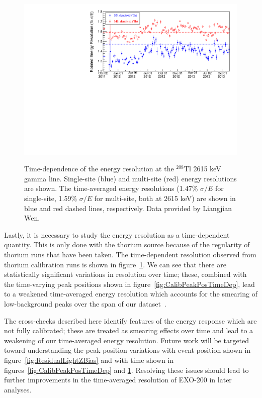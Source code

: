 \begin{figure}
\begin{center}
\includegraphics[keepaspectratio=true,width=\textwidth]{ThDenoisedResVsTime.pdf}
\end{center}
\renewcommand{\baselinestretch}{1}
\small\normalsize
\begin{quote}
\caption{Time-dependence of the energy resolution at the $^{208}$Tl 2615 keV gamma line.  Single-site (blue) and multi-site (red) energy resolutions are shown.  The time-averaged energy resolutions (1.47\% $\sigma/E$ for single-site, 1.59\% $\sigma/E$ for multi-site, both at 2615 keV) are shown in blue and red dashed lines, respectively.  Data provided by Liangjian Wen.}
\label{fig:ThoriumDenoisedResVsTime}
\end{quote}
\end{figure}
\renewcommand{\baselinestretch}{2}
\small\normalsize

Lastly, it is necessary to study the energy resolution as a time-dependent quantity.  This is only done with the thorium source because of the regularity of thorium runs that have been taken.  The time-dependent resolution observed from thorium calibration runs is shown in figure~\ref{fig:ThoriumDenoisedResVsTime}.  We can see that there are statistically significant variations in resolution over time; these, combined with the time-varying peak positions shown in figure~\ref{fig:CalibPeakPosTimeDep}, lead to a weakened time-averaged energy resolution which accounts for the smearing of low-background peaks over the span of our dataset~\cite{AverageEnergyResolutionDocument}.

The cross-checks described here identify features of the energy response which are not fully calibrated; these are treated as smearing effects over time and lead to a weakening of our time-averaged energy resolution.  Future work will be targeted toward understanding the peak position variations with event position shown in figure~\ref{fig:ResidualLightZBias} and with time shown in figures~\ref{fig:CalibPeakPosTimeDep} and \ref{fig:ThoriumDenoisedResVsTime}.  Resolving these issues should lead to further improvements in the time-averaged resolution of EXO-200 in later analyses.

